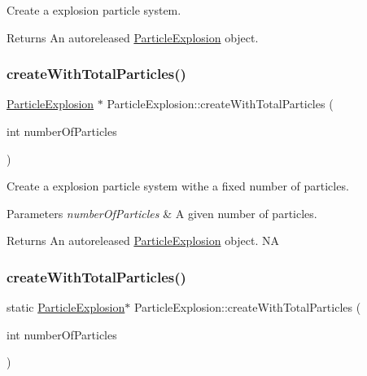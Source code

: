 Create a explosion particle system.

\begin{DoxyReturn}{Returns}
An autoreleased \hyperlink{classParticleExplosion}{Particle\+Explosion} object. 
\end{DoxyReturn}
\mbox{\label{classParticleExplosion_abfa9a2a4890de46a735a208d79175395}} 
\subsubsection{\texorpdfstring{create\+With\+Total\+Particles()}{createWithTotalParticles()}\hspace{0.1cm}{\footnotesize\ttfamily [1/2]}}
{\footnotesize\ttfamily \hyperlink{classParticleExplosion}{Particle\+Explosion} $\ast$ Particle\+Explosion\+::create\+With\+Total\+Particles (\begin{DoxyParamCaption}\item[{int}]{number\+Of\+Particles }\end{DoxyParamCaption})\hspace{0.3cm}{\ttfamily [static]}}

Create a explosion particle system withe a fixed number of particles.


\begin{DoxyParams}{Parameters}
{\em number\+Of\+Particles} & A given number of particles. \\
\hline
\end{DoxyParams}
\begin{DoxyReturn}{Returns}
An autoreleased \hyperlink{classParticleExplosion}{Particle\+Explosion} object.  NA 
\end{DoxyReturn}
\mbox{\label{classParticleExplosion_af619deccf9dfa214cd27d70b0651131f}} 
\subsubsection{\texorpdfstring{create\+With\+Total\+Particles()}{createWithTotalParticles()}\hspace{0.1cm}{\footnotesize\ttfamily [2/2]}}
{\footnotesize\ttfamily static \hyperlink{classParticleExplosion}{Particle\+Explosion}$\ast$ Particle\+Explosion\+::create\+With\+Total\+Particles (\begin{DoxyParamCaption}\item[{int}]{number\+Of\+Particles }\end{DoxyParamCaption})\hspace{0.3cm}{\ttfamily [static]}}

